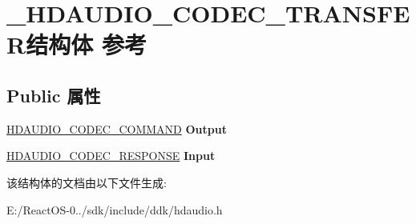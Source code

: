 \hypertarget{struct___h_d_a_u_d_i_o___c_o_d_e_c___t_r_a_n_s_f_e_r}{}\section{\+\_\+\+H\+D\+A\+U\+D\+I\+O\+\_\+\+C\+O\+D\+E\+C\+\_\+\+T\+R\+A\+N\+S\+F\+E\+R结构体 参考}
\label{struct___h_d_a_u_d_i_o___c_o_d_e_c___t_r_a_n_s_f_e_r}
\subsection*{Public 属性}
\begin{DoxyCompactItemize}
\item 
\mbox{\label{struct___h_d_a_u_d_i_o___c_o_d_e_c___t_r_a_n_s_f_e_r_aed5adb8e3eb22138044872a992e7bea9}} 
\hyperlink{struct___h_d_a_u_d_i_o___c_o_d_e_c___c_o_m_m_a_n_d}{H\+D\+A\+U\+D\+I\+O\+\_\+\+C\+O\+D\+E\+C\+\_\+\+C\+O\+M\+M\+A\+ND} {\bfseries Output}
\item 
\mbox{\label{struct___h_d_a_u_d_i_o___c_o_d_e_c___t_r_a_n_s_f_e_r_ab49c170e6bdb7977ddf2777ba51108e0}} 
\hyperlink{struct___h_d_a_u_d_i_o___c_o_d_e_c___r_e_s_p_o_n_s_e}{H\+D\+A\+U\+D\+I\+O\+\_\+\+C\+O\+D\+E\+C\+\_\+\+R\+E\+S\+P\+O\+N\+SE} {\bfseries Input}
\end{DoxyCompactItemize}


该结构体的文档由以下文件生成\+:\begin{DoxyCompactItemize}
\item 
E\+:/\+React\+O\+S-\/0../sdk/include/ddk/hdaudio.\+h\end{DoxyCompactItemize}
